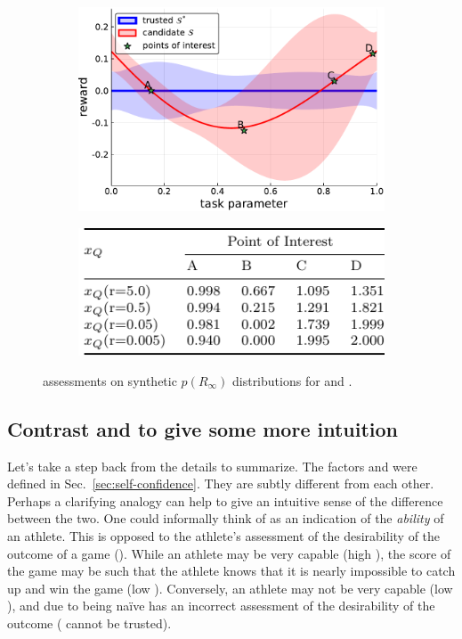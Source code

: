 \begin{figure}[tbp]
    \centering
    \begin{subfigure}[c]{0.65\linewidth}
        \centering
        \includegraphics[width=0.7\linewidth]{Figures/p1.pdf}
        \vfill
    \end{subfigure}%
    \hfill
    \begin{subfigure}[t]{0.35\linewidth}
        \centering
        \includegraphics[width=1.0\linewidth]{Figures/p1_table.pdf}
    \end{subfigure} 
    \caption{\xQ{} assessments on synthetic $p(R_{\infty})$ distributions for \solvestar{} and \solve{}.}
    \label{fig:sq_thry1}
\end{figure}

\subsection{Contrast \xQ{} and \xO{} to give some more intuition}
Let's take a step back from the details to summarize. The factors \xQ{} and \xO{} were defined in Sec.~\ref{sec:self-confidence}. They are subtly different from each other. Perhaps a clarifying analogy can help to give an intuitive sense of the difference between the two. One could informally think of \xQ{} as an indication of the \emph{ability} of an athlete. This is opposed to the athlete's assessment of the desirability of the outcome of a game (\xO). While an athlete may be very capable (high \xQ), the score of the game may be such that the athlete knows that it is nearly impossible to catch up and win the game (low \xO). Conversely, an athlete may not be very capable (low \xQ), and due to being na\"{i}ve has an incorrect assessment of the desirability of the outcome (\xO{} cannot be trusted).
